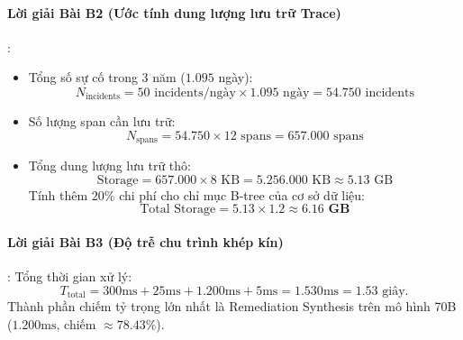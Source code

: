 \paragraph{Lời giải Bài B2 (Ước tính dung lượng lưu trữ Trace)}:
\begin{itemize}
  \item Tổng số sự cố trong 3 năm ($1.095$ ngày):
  \begin{equation*}
  N_{\text{incidents}} = 50 \text{ incidents/ngày} \times 1.095 \text{ ngày} = 54.750 \text{ incidents}
  \end{equation*}
  \item Số lượng span cần lưu trữ:
  \begin{equation*}
  N_{\text{spans}} = 54.750 \times 12 \text{ spans} = 657.000 \text{ spans}
  \end{equation*}
  \item Tổng dung lượng lưu trữ thô:
  \begin{equation*}
  \text{Storage} = 657.000 \times 8 \text{ KB} = 5.256.000 \text{ KB} \approx 5.13 \text{ GB}
  \end{equation*}
  Tính thêm $20\%$ chi phí cho chỉ mục B-tree của cơ sở dữ liệu:
  \begin{equation*}
  \text{Total Storage} = 5.13 \times 1.2 \approx \mathbf{6.16 \text{ GB}}
  \end{equation*}
\end{itemize}

\paragraph{Lời giải Bài B3 (Độ trễ chu trình khép kín)}:
Tổng thời gian xử lý:
\begin{equation*}
T_{\text{total}} = 300\text{ms} + 25\text{ms} + 1.200\text{ms} + 5\text{ms} = 1.530\text{ms} = 1.53\text{ giây}.
\end{equation*}
Thành phần chiếm tỷ trọng lớn nhất là Remediation Synthesis trên mô hình 70B ($1.200\text{ms}$, chiếm $\approx 78.43\%$).


